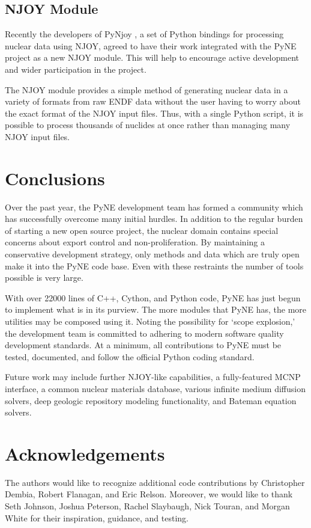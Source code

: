 \documentclass{anstrans}
\begin{document}
\subsection{NJOY Module}
Recently the developers of PyNjoy \cite{dragon}, a set of Python bindings for processing
nuclear data using NJOY, agreed to have their work integrated with the PyNE
project as a new NJOY module. This will help to encourage active development and
wider participation in the project.

The NJOY module provides a simple method of generating nuclear data in a variety
of formats from raw ENDF data without the user having to worry about the exact
format of the NJOY input files. Thus, with a single Python script, it is
possible to process thousands of nuclides at once rather than managing
many NJOY input files.


\section{Conclusions}
Over the past year, the PyNE development team has formed a community 
which has successfully overcome many initial hurdles.  In addition to
the regular burden of starting a new open source project, the nuclear 
domain contains special concerns about export control and non-proliferation.
By maintaining a conservative development strategy, only methods and data
which are truly open make it into the PyNE code base.  Even with these 
restraints the number of tools possible is very large.

With over 22000 lines of C++, Cython, and Python code, PyNE has just begun to
implement what is in its purview.  The more modules that PyNE has, the more
utilities may be composed using it.   Noting the possibility for 
`scope explosion,' the development team is committed to adhering to 
modern software quality development standards.  At a minimum, all contributions 
to PyNE must be tested, documented, and follow the official Python coding
standard.

Future work may include further NJOY-like capabilities, a fully-featured 
MCNP interface, a common nuclear materials database, various infinite medium
diffusion solvers, deep geologic repository modeling functionality, and Bateman 
equation solvers.

\section*{Acknowledgements}
The authors would like to recognize additional code contributions by 
Christopher Dembia, Robert Flanagan, and Eric Relson.  Moreover, we 
would like to thank
Seth Johnson,
Joshua Peterson, 
Rachel Slaybaugh, 
Nick Touran,
and Morgan White
for their inspiration, guidance, and testing.


\nocite{*}


\end{document}
